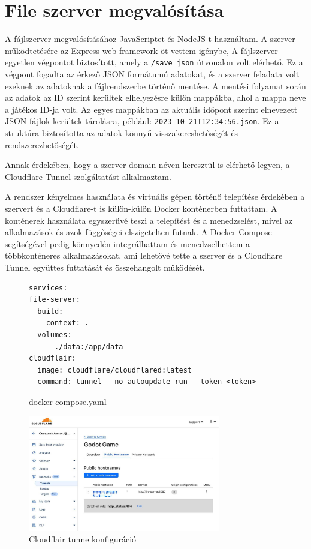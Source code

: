 \section{File szerver megvalósítása}
A fájlszerver megvalósításához JavaScriptet és NodeJS-t használtam.
A szerver működtetésére az Express web framework-öt vettem igénybe, 
A fájlszerver egyetlen végpontot biztosított, amely a \lstinline{/save_json} útvonalon volt elérhető. 
Ez a végpont fogadta az érkező JSON formátumú adatokat, és a szerver feladata volt ezeknek az adatoknak a fájlrendszerbe történő mentése. 
A mentési folyamat során az adatok az ID szerint kerültek elhelyezésre külön mappákba, ahol a mappa neve a játékos ID-ja volt. 
Az egyes mappákban az aktuális időpont szerint elnevezett JSON fájlok kerültek tárolásra, például: \texttt{2023-10-21T12:34:56.json}. 
Ez a struktúra biztosította az adatok könnyű visszakereshetőségét és rendszerezhetőségét.

Annak érdekében, hogy a szerver domain néven keresztül is elérhető legyen, a Cloudflare Tunnel szolgáltatást alkalmaztam. 

A rendszer kényelmes használata és virtuális gépen történő telepítése érdekében a szervert és a Cloudflare-t is külön-külön Docker konténerben futtattam.
A konténerek használata egyszerűvé teszi a telepítést és a menedzselést, mivel az alkalmazások és azok függőségei elszigetelten futnak. 
A Docker Compose segítségével pedig könnyedén integrálhattam és menedzselhettem a többkonténeres alkalmazásokat, ami lehetővé tette a szerver és a Cloudflare Tunnel együttes futtatását és összehangolt működését.

\begin{figure}[h]
    \centering
\begin{lstlisting}
services:
file-server:
  build:
    context: .
  volumes:
    - ./data:/app/data
cloudflair:
  image: cloudflare/cloudflared:latest 
  command: tunnel --no-autoupdate run --token <token>
\end{lstlisting}
\caption*{docker-compose.yaml}
\label{code:docker-compose}
\end{figure}
\begin{figure}[h]
    \centering
    \includegraphics[width=0.75\textwidth]{img/cloudflair-censored.jpg}
    \caption{Cloudflair tunne konfiguráció}
    \label{img:cloudflair-config}  
\end{figure}


